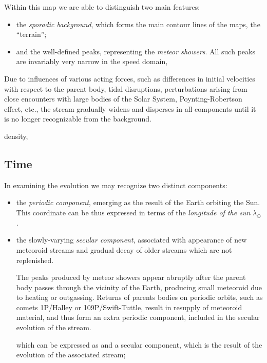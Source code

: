     Within this map we are able to distinguish two main features:
    \begin{itemize}
        \item the \emph{sporadic background}, which forms the main contour lines of the maps, the ``terrain'';
        \item and the well-defined peaks, representing the \emph{meteor showers}. All such peaks are invariably
            very narrow in the speed domain, 
        
    \end{itemize}
        Due to influences of various acting forces, such as differences
        in initial velocities with respect to the parent body, tidal disruptions, 
        perturbations arising from close encounters with large bodies of the Solar System,
        Poynting-Robertson effect, etc., the stream
        gradually widens and disperses in all components until it is no longer recognizable from the background.

        density, 


        \subsection{Time} \label{i}
            In examining the evolution we may recognize two distinct components:
            \begin{itemize}
                \item the \emph{periodic component}, emerging as the result of the Earth orbiting the Sun.
                    This coordinate can be thus expressed in terms of the \emph{longitude of the sun} $\lambda_\odot$.

                \item the slowly-varying \emph{secular component}, associated with appearance of new meteoroid streams and gradual decay of older
                    streams which are not replenished.

                    The peaks produced by meteor showers appear abruptly after the parent body passes through the vicinity of the Earth,
                    producing small meteoroid due to heating or outgassing.
                    Returns of parents bodies on periodic orbits, such as comets 1P/Halley or 109P/Swift-Tuttle, result
                    in resupply of meteoroid material, and thus form an extra periodic component, included in the secular evolution of the stream.

                
            which can be expressed as and a secular component, which is the result
            of the evolution of the associated stream;

            \end{itemize}
